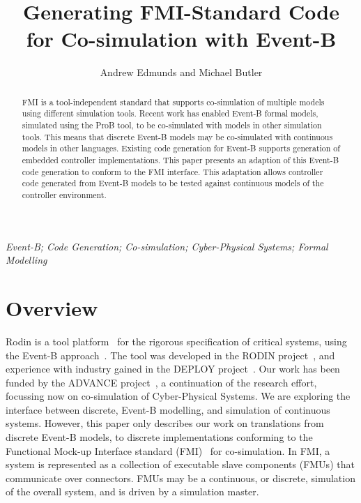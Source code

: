 \documentclass{llncs}%
\begin{document}
%
\thispagestyle{empty}

\title{Generating FMI-Standard Code\\ for Co-simulation with Event-B}
\author{Andrew Edmunds and Michael Butler}
\maketitle
%
\begin{abstract}
FMI is a tool-independent standard that supports co-simulation of multiple models using different simulation tools.  Recent work has enabled Event-B formal models, simulated using the ProB tool, to be co-simulated with models in other simulation tools. This means that discrete Event-B models may be co-simulated with continuous models in other languages.  Existing code generation for Event-B supports generation of embedded controller implementations. This paper presents an adaption of this Event-B code generation to conform to the FMI interface.  This adaptation allows controller code generated from Event-B models to be tested against continuous models of the controller environment.
\end{abstract}
%
\emph{Event-B; Code Generation; Co-simulation; Cyber-Physical Systems; Formal Modelling}
%
\section{Overview}
Rodin is a  tool platform~\cite{abrial10rodin} for the rigorous specification of critical systems, using the Event-B approach~\cite{ABR10}. The tool was developed in the RODIN project~\cite{RodinTool}, and experience with industry gained in the DEPLOY project~\cite{DEPLOY}. Our work has been funded by the ADVANCE project~\cite{advance}, a continuation of the research effort, focussing now on co-simulation of Cyber-Physical Systems. We are exploring the interface between discrete, Event-B modelling, and simulation of continuous systems. However, this paper only describes our work on translations from discrete Event-B models, to discrete implementations conforming to the Functional Mock-up Interface standard (FMI)~\cite{FMISTD} for co-simulation. In FMI, a system is represented as a collection of executable slave components (FMUs) that communicate over connectors.  FMUs may be a continuous, or discrete, simulation of the overall system, and is driven by a simulation master.
\end{document}
